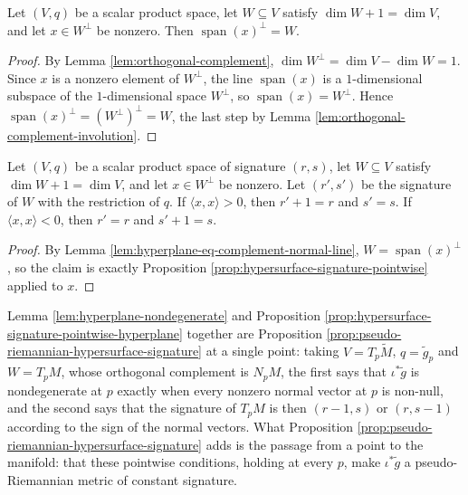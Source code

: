 \begin{lemma}
\label{lem:hyperplane-eq-complement-normal-line}
\leanok
{}
Let $(V,q)$ be a scalar product space, let $W \subseteq V$ satisfy $\dim W + 1 = \dim V$, and let $x \in W^\perp$ be nonzero. Then $\operatorname{span}(x)^\perp = W$.
\end{lemma}

\begin{proof}
\leanok
{}
By Lemma \ref{lem:orthogonal-complement}, $\dim W^\perp = \dim V - \dim W = 1$. Since $x$ is a nonzero element of $W^\perp$, the line $\operatorname{span}(x)$ is a $1$-dimensional subspace of the $1$-dimensional space $W^\perp$, so $\operatorname{span}(x) = W^\perp$. Hence $\operatorname{span}(x)^\perp = (W^\perp)^\perp = W$, the last step by Lemma \ref{lem:orthogonal-complement-involution}.
\end{proof}

\begin{proposition}
\label{prop:hypersurface-signature-pointwise-hyperplane}
\leanok
{}
Let $(V,q)$ be a scalar product space of signature $(r,s)$, let $W \subseteq V$ satisfy $\dim W + 1 = \dim V$, and let $x \in W^\perp$ be nonzero. Let $(r',s')$ be the signature of $W$ with the restriction of $q$. If $\langle x,x\rangle > 0$, then $r' + 1 = r$ and $s' = s$. If $\langle x,x\rangle < 0$, then $r' = r$ and $s' + 1 = s$.
\end{proposition}

\begin{proof}
\leanok
{}
By Lemma \ref{lem:hyperplane-eq-complement-normal-line}, $W = \operatorname{span}(x)^\perp$, so the claim is exactly Proposition \ref{prop:hypersurface-signature-pointwise} applied to $x$.
\end{proof}

Lemma \ref{lem:hyperplane-nondegenerate} and Proposition \ref{prop:hypersurface-signature-pointwise-hyperplane} together are Proposition \ref{prop:pseudo-riemannian-hypersurface-signature} at a single point: taking $V = T_p\tilde M$, $q = \tilde g_p$ and $W = T_pM$, whose orthogonal complement is $N_pM$, the first says that $\iota^*\tilde g$ is nondegenerate at $p$ exactly when every nonzero normal vector at $p$ is non-null, and the second says that the signature of $T_pM$ is then $(r-1,s)$ or $(r,s-1)$ according to the sign of the normal vectors. What Proposition \ref{prop:pseudo-riemannian-hypersurface-signature} adds is the passage from a point to the manifold: that these pointwise conditions, holding at every $p$, make $\iota^*\tilde g$ a pseudo-Riemannian metric of constant signature.

